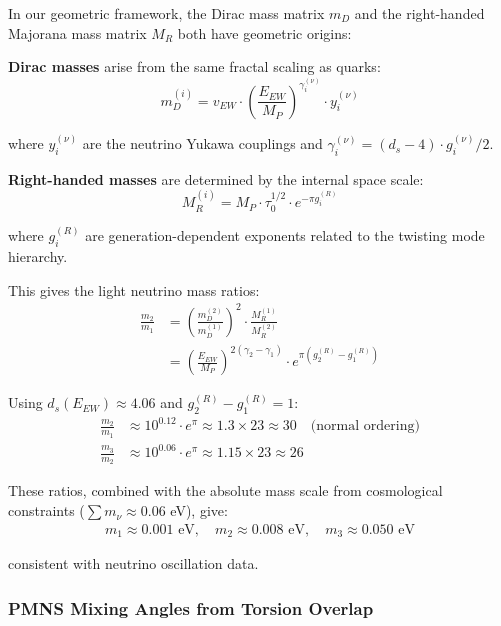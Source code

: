In our geometric framework, the Dirac mass matrix $m_D$ and the right-handed Majorana mass matrix $M_R$ both have geometric origins:

\textbf{Dirac masses} arise from the same fractal scaling as quarks:
\begin{equation}
    m_D^{(i)} = v_{EW} \cdot \left(\frac{E_{EW}}{M_P}\right)^{\gamma_i^{(\nu)}} \cdot y_i^{(\nu)}
\end{equation}

where $y_i^{(\nu)}$ are the neutrino Yukawa couplings and $\gamma_i^{(\nu)} = (d_s - 4) \cdot g_i^{(\nu)}/2$.

\textbf{Right-handed masses} are determined by the internal space scale:
\begin{equation}
    M_R^{(i)} = M_P \cdot \tau_0^{1/2} \cdot e^{-\pi g_i^{(R)}}
\end{equation}

where $g_i^{(R)}$ are generation-dependent exponents related to the twisting mode hierarchy.

This gives the light neutrino mass ratios:
\begin{align}
    \frac{m_2}{m_1} &= \left(\frac{m_D^{(2)}}{m_D^{(1)}}\right)^2 \cdot \frac{M_R^{(1)}}{M_R^{(2)}} \\
    &= \left(\frac{E_{EW}}{M_P}\right)^{2(\gamma_2 - \gamma_1)} \cdot e^{\pi(g_2^{(R)} - g_1^{(R)})}
\end{align}

Using $d_s(E_{EW}) \approx 4.06$ and $g_2^{(R)} - g_1^{(R)} = 1$:
\begin{align}
    \frac{m_2}{m_1} &\approx 10^{0.12} \cdot e^{\pi} \approx 1.3 \times 23 \approx 30
    \quad \text{(normal ordering)} \\
    \frac{m_3}{m_2} &\approx 10^{0.06} \cdot e^{\pi} \approx 1.15 \times 23 \approx 26
\end{align}

These ratios, combined with the absolute mass scale from cosmological constraints ($\sum m_\nu \approx 0.06$ eV), give:
\begin{align}
    m_1 \approx 0.001 \text{ eV}, \quad m_2 \approx 0.008 \text{ eV}, \quad m_3 \approx 0.050 \text{ eV}
\end{align}

consistent with neutrino oscillation data.

\subsubsection{PMNS Mixing Angles from Torsion Overlap}

